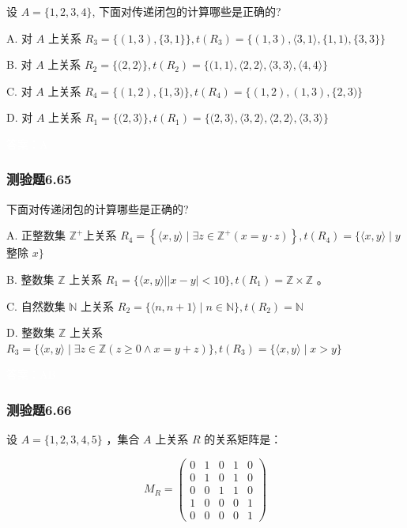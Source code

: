 \documentclass[UTF8, heading=true]{ctexart}
\begin{document}
设 $A=\{1,2,3,4\}$, 下面对传递闭包的计算哪些是正确的?

A. 
对 $A$ 上关系 $R_3=\{(1,3),\{3,1\}\}, t\left(R_3\right)=\{(1,3),\langle 3,1\rangle,\{1,1),\{3,3\}\}$

B. 
对 $A$ 上关系 $R_2=\{(2,2\rangle\}, t\left(R_2\right)=\{(1,1\rangle,\langle 2,2\rangle,\langle 3,3\rangle,\langle 4,4\rangle\}$

C. 
对 $A$ 上关系 $R_4=\{(1,2),\{1,3)\}, t\left(R_4\right)=\{(1,2),(1,3),\{2,3)\}$

D. 
对 $A$ 上关系 $R_1=\{(2,3\rangle\}, t\left(R_1\right)=\{(2,3\rangle,\langle 3,2\rangle,\langle 2,2\rangle,\langle 3,3\rangle\}$

\textcolor{white}{答案：A}


\subsubsection{测验题6.65}
下面对传递闭包的计算哪些是正确的?

A. 正整数集 $\mathbb{Z}^{+}$上关系 $R_4=\left\{\langle x, y\rangle \mid \exists z \in \mathbb{Z}^{+}(x=y \cdot z)\right\}, t\left(R_4\right)=\{\langle x, y\rangle \mid y$ 整除 $x\}$

B. 整数集 $\mathbb{Z}$ 上关系 $R_1=\{\langle x, y\rangle| | x-y \mid<10\}, t\left(R_1\right)=\mathbb{Z} \times \mathbb{Z}$ 。

C. 自然数集 $\mathbb{N}$ 上关系 $R_2=\{\langle n, n+1\rangle \mid n \in \mathbb{N}\}, t\left(R_2\right)=\mathbb{N}$

D. 整数集 $\mathbb{Z}$ 上关系 $R_3=\{\langle x, y\rangle \mid \exists z \in \mathbb{Z}(z \geq 0 \wedge x=y+z)\}, t\left(R_3\right)=\{\langle x, y\rangle \mid x>y\}$

\textcolor{white}{答案：AB}

\subsubsection{测验题6.66}

设 $A=\{1,2,3,4,5\}$ ，集合 $A$ 上关系 $R$ 的关系矩阵是：

$$
M_R=\left(\begin{array}{lllll}
0 & 1 & 0 & 1 & 0 \\
0 & 1 & 0 & 1 & 0 \\
0 & 0 & 1 & 1 & 0 \\
1 & 0 & 0 & 0 & 1 \\
0 & 0 & 0 & 0 & 1
\end{array}\right)
$$
\end{document}
